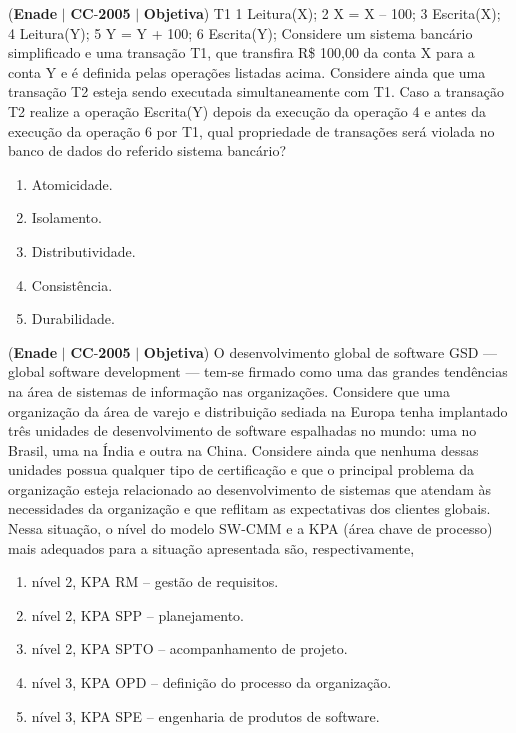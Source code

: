 \documentclass{exam}
\begin{document}
\begin{questions}
\question (\textbf{Enade} $|$ \textbf{CC}-\textbf{2005} $|$ \textbf{Objetiva})
T1
1 Leitura(X);
2 X = X – 100;
3 Escrita(X);
4 Leitura(Y);
5 Y = Y + 100;
6 Escrita(Y);
Considere um sistema bancário simplificado e uma transação T1,
que transfira R\$ 100,00 da conta X para a conta Y e é definida
pelas operações listadas acima. Considere ainda que uma transação
T2 esteja sendo executada simultaneamente com T1. Caso a
transação T2 realize a operação Escrita(Y) depois da execução
da operação 4 e antes da execução da operação 6 por T1, qual
propriedade de transações será violada no banco de dados do
referido sistema bancário?
	\begin{enumerate}[label=\alph*)]
		\item  Atomicidade.
		\item  Isolamento.
		\item  Distributividade.
		\item  Consistência.
		\item  Durabilidade.
	\end{enumerate}

\question (\textbf{Enade} $|$ \textbf{CC}-\textbf{2005} $|$ \textbf{Objetiva})
O desenvolvimento global de software GSD — global
software development — tem-se firmado como uma das
grandes tendências na área de sistemas de informação nas
organizações. Considere que uma organização da área de
varejo e distribuição sediada na Europa tenha implantado três
unidades de desenvolvimento de software espalhadas no
mundo: uma no Brasil, uma na Índia e outra na China.
Considere ainda que nenhuma dessas unidades possua
qualquer tipo de certificação e que o principal problema da
organização esteja relacionado ao desenvolvimento de
sistemas que atendam às necessidades da organização e que
reflitam as expectativas dos clientes globais.
Nessa situação, o nível do modelo SW-CMM e a KPA (área chave
de processo) mais adequados para a situação apresentada são,
respectivamente,
	\begin{enumerate}[label=\alph*)]
		\item  nível 2, KPA RM – gestão de requisitos.
		\item  nível 2, KPA SPP – planejamento.
		\item  nível 2, KPA SPTO – acompanhamento de projeto.
		\item  nível 3, KPA OPD – definição do processo da organização.
		\item  nível 3, KPA SPE – engenharia de produtos de software.
	\end{enumerate}


\end{questions}
\end{document}
